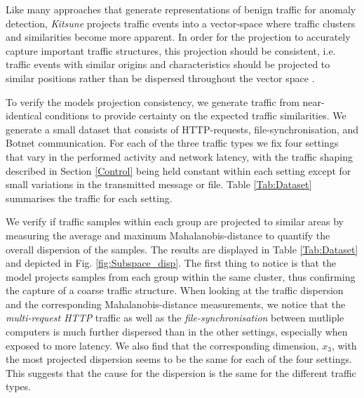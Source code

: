 \documentclass[conference]{IEEEtran}
\begin{document}
Like many approaches that generate representations of benign traffic for anomaly detection, \textit{Kitsune} projects traffic events into a vector-space where traffic clusters and similarities become more apparent. In order for the projection to accurately capture important traffic structures, this projection should be consistent, i.e. traffic events with similar origins and characteristics should be projected to similar positions rather than be dispersed throughout the vector space \cite{hou2017deep}.


To verify the models projection consistency, we generate traffic from near-identical conditions to provide certainty on the expected traffic similarities. We generate a small dataset that consists of HTTP-requests, file-synchronisation, and Botnet communication. For each of the three traffic types we fix four settings that vary in the performed activity and network latency, with the traffic shaping described in Section \ref{Control} being held constant within each setting except for small variations in the transmitted message or file. Table \ref{Tab:Dataset} summarises the traffic for each setting. 

We verify if traffic samples within each group are projected to similar areas by measuring the average and maximum Mahalanobis-distance to quantify the overall dispersion of the samples. The results are displayed in Table \ref{Tab:Dataset} and depicted in Fig. \ref{fig:Subspace_disp}. The first thing to notice is that the model projects samples from each group within the same cluster, thus confirming the capture of a coarse traffic structure. When looking at the traffic dispersion and the corresponding Mahalanobis-distance measurements, we notice that the \textit{multi-request HTTP} traffic as well as the \textit{file-synchronisation} between mutliple computers is much further dispersed than in the other settings, especially when exposed to more latency. We also find that the corresponding dimension, $x_3$, with the most projected dispersion seems to be the same for each of the four settings. This suggests that the cause for the dispersion is the same for the different traffic types. 
\end{document}
